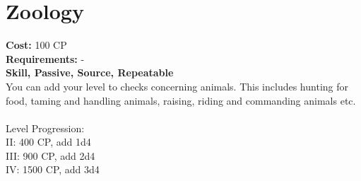 \section{Zoology}
\textbf{Cost:} 100 CP\\
\textbf{Requirements:} -\\
\textbf{Skill, Passive, Source, Repeatable}\\
You can add your level to checks concerning animals. This includes hunting for food, taming and handling animals, raising, riding and commanding animals etc.\\
\\
Level Progression:\\
II: 400 CP, add 1d4\\
III: 900 CP, add 2d4\\
IV: 1500 CP, add 3d4\\
